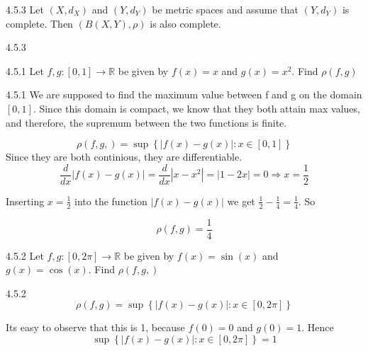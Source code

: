 \documentclass[a4paper,norsk]{article}
\begin{document}
\begin{theorembox}{4.5.3}{}
Let $ \left( X, d_X \right)  $ and $ \left( Y, d_Y \right)  $ be metric spaces and assume that $ \left( Y, d_Y \right)  $ is complete. Then $ \left( B \left( X, Y \right) , \rho \right)  $ is also complete.

\begin{proofbox}{4.5.3}{}
  
\end{proofbox}
\end{theorembox}


\begin{oppgavebox}{4.5.1}{}
Let $ f, g : \left[ 0, 1  \right] \to \mathbb{R} $ be given by $ f(x) =x$ and $ g(x) = x^2 $. Find $ \rho \left( f, g \right)  $

\begin{proofbox}{4.5.1}{}
  We are supposed to find the maximum value between f and g on the domain $ \left[ 0, 1 \right]  $. Since this domain is compact, we know that they both attain max values, and therefore, the supremum between the two functions is finite. 

  \[
      \rho \left( f,g,  \right) = \sup \left\{ \left| f(x) - g(x) \right| : x \in \left[ 0, 1 \right]  \right\} 
  \]
  Since they are both continious, they are differentiable. 
  \[
      \frac{ d }{ dx } \left| f(x) - g(x) \right| = \frac{ d }{ dx } \left| x - x^2 \right| = \left| 1 - 2x \right| = 0 \Rightarrow x = \frac{ 1 }{ 2 }
  \]

  Inserting $ x = \frac{ 1 }{ 2 } $ into the function $ \left| f(x) - g(x) \right|  $ we get $ \frac{ 1 }{ 2 } - \frac{ 1 }{ 4 } = \frac{ 1 }{ 4 } $. So 

  \[
      \rho \left( f, g \right) = \frac{ 1 }{ 4 }
  \]
  
\end{proofbox}
\end{oppgavebox}

\begin{oppgavebox}{4.5.2}{}
Let $ f, g : \left[ 0, 2\pi  \right] \to \mathbb{R}  $ be given by $ f(x) = \sin(x)  $ and $ g(x) = \cos(x)   $. Find $ \rho \left( f, g,  \right)  $  
\begin{proofbox}{4.5.2}{}
  \[
      \rho \left( f,g  \right) = \sup \left\{ \left| f(x) - g(x) \right| : x \in \left[ 0, 2\pi  \right]   \right\}
  \]

  Its easy to observe that this is 1, because $ f(0) =0 $ and $ g(0) =1  $. Hence
  \[
      \sup \left\{ \left| f(x) - g(x) \right| : x \in \left[ 0, 2\pi  \right]   \right\} = 1
  \]
\end{proofbox}


\end{oppgavebox}
\end{document}
